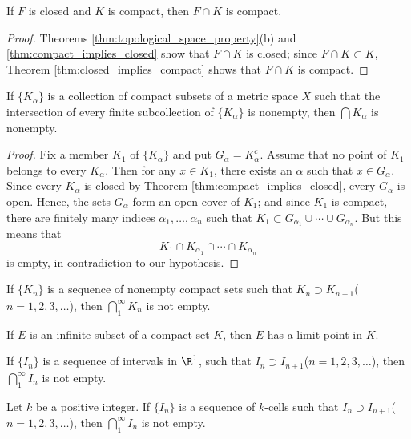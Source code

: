 \begin{corollary}
    If $F$ is closed and $K$ is compact, then $F \cap K$ is compact.
\end{corollary}
\begin{proof}
    Theorems \ref{thm:topological_space_property}(b) and \ref{thm:compact_implies_closed} show that $F \cap K$ is closed;
    since $F \cap K \subset K$, Theorem \ref{thm:closed_implies_compact} shows that $F \cap K$ is compact.
\end{proof}
\begin{theorem}
If $\{K_{\alpha}\}$ is a collection of compact subsets of a metric space $X$ such that the intersection of every finite subcollection of $\{K_{\alpha}\}$ is nonempty, then $\bigcap K_{\alpha}$ is nonempty.
\end{theorem}
\begin{proof}
Fix a member $K_1$ of $\{K_{\alpha}\}$ and put $G_{\alpha}=K_{\alpha}^c$. 
Assume that no point of $K_1$ belongs to every $K_{\alpha}$.
Then for any $x \in K_1$, there exists an $\alpha$ such that $x \in G_{\alpha}$.
Since every $K_{\alpha}$ is closed by Theorem \ref{thm:compact_implies_closed}, every $G_{\alpha}$ is open.
Hence, the sets $G_{\alpha}$ form an open cover of $K_1$;
and since $K_1$ is compact, there are finitely many indices $\alpha_1, \ldots, \alpha_n$ such that $K_1 \subset G_{\alpha_1} \cup \cdots \cup G_{\alpha_n}$.
But this means that 
\[
K_1 \cap K_{\alpha_1} \cap \cdots \cap K_{\alpha_n}
\]
is empty, in contradiction to our hypothesis.
\end{proof}
\begin{corollary}
If $\{K_n\}$ is a sequence of nonempty compact sets such that $K_n \supset K_{n+1}$($n=1, 2, 3, \ldots$), then $\bigcap_{1}^{\infty}K_n$ is not empty.
\end{corollary}

\begin{theorem}\label{thm:compact_limit}
If $E$ is an infinite subset of a compact set $K$, then $E$ has a limit point in $K$.
\end{theorem}


\begin{theorem}
If $\{I_n\}$ is a sequence of intervals in $\R^1$, such that $I_n \supset I_{n+1}$($n=1,2,3,\ldots$), then $\bigcap_{1}^{\infty}I_n$ is not empty.
\end{theorem}

\begin{theorem}
Let $k$ be a positive integer. 
If $\{I_n\}$ is a sequence of $k$-cells such that $I_n \supset I_{n+1}$($n=1,2,3,\ldots$), then $\bigcap_{1}^{\infty}I_n$ is not empty.
\end{theorem}

